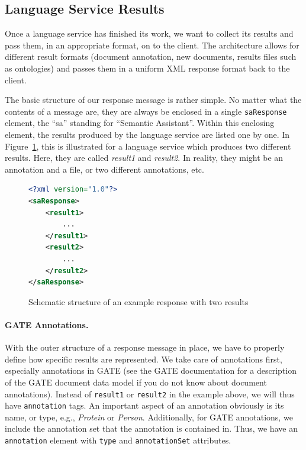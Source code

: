 \subsection{Language Service Results}
\label{sec:response}
Once a language service has finished its work, we want to collect its
results and pass them, in an appropriate format, on to the client. The
\sa architecture allows for different result formats (document
annotation, new documents, results files such as ontologies) and
passes them in a uniform XML response format back to the client.

The basic structure of our response message is rather simple. No
matter what the contents of a message are, they are always be enclosed
in a single \texttt{saResponse} element, the ``sa'' standing for
``Semantic Assistant''. Within this enclosing element, the results
produced by the language service are listed one by one. In
Figure~\ref{list:response1}, this is illustrated for a language
service which produces two different results. Here, they are called
\emph{result1} and \emph{result2}. In reality, they might be an
annotation and a file, or two different annotations, etc.

\begin{figure}[htb]
\begin{lstlisting}[language=XML,xleftmargin=8mm,columns=flexible]
<?xml version="1.0"?>
<saResponse>
    <result1>
        ...
    </result1>
    <result2>
        ...
    </result2>
</saResponse>
\end{lstlisting}
\caption{Schematic structure of an example response with two results}
\label{list:response1}
\end{figure}


\paragraph{GATE Annotations.} With the outer structure of a response
message in place, we have to properly define how specific results are
represented. We take care of annotations first, especially annotations
in GATE (see the GATE documentation for a description of the GATE
document data model if you do not know about document annotations).
Instead of \texttt{result1} or \texttt{result2} in the example above,
we will thus have \texttt{annotation} tags. An important aspect of an
annotation obviously is its name, or type, e.g., \emph{Protein} or
\emph{Person}.  Additionally, for GATE annotations, we include the
annotation set that the annotation is contained in. Thus, we have an
\texttt{annotation} element with \texttt{type} and
\texttt{annotationSet} attributes.

